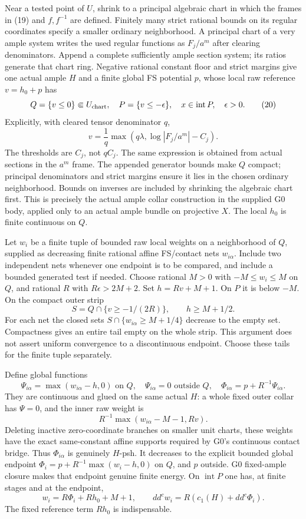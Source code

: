 \documentclass[
  10pt,
]{article}
\begin{document}
Near a tested point of \(U\), shrink to a principal algebraic chart in
which the frames in (19) and \(f,f^{-1}\) are defined. Finitely many
strict rational bounds on its regular coordinates specify a smaller
ordinary neighborhood. A principal chart of a very ample system writes
the used regular functions as \(F_j/a^m\) after clearing denominators.
Append a complete sufficiently ample section system; its ratios generate
that chart ring. Negative rational constant floor and strict margins
give one actual ample \(H\) and a finite global FS potential \(p\),
whose local raw reference \(v=h_0+p\) has
\[Q=\{v\leq0\}\Subset U_{\rm chart},\quad
P=\{v\leq-\epsilon\},\quad x\in\operatorname{int}P,\quad\epsilon>0.\tag{20}\]
Explicitly, with cleared tensor denominator \(q\),
\[v=\frac1q\max(q\lambda,\log|F_j/a^m|-C_j).\tag{21}\] The thresholds
are \(C_j\), not \(qC_j\). The same expression is obtained from actual
sections in the \(a^m\) frame. The appended generator bounds make \(Q\)
compact; principal denominators and strict margins ensure it lies in the
chosen ordinary neighborhood. Bounds on inverses are included by
shrinking the algebraic chart first. This is precisely the actual ample
collar construction in the supplied G0 body, applied only to an actual
ample bundle on projective \(X\). The local \(h_0\) is finite continuous
on \(Q\).

Let \(w_i\) be a finite tuple of bounded raw local weights on a
neighborhood of \(Q\), supplied as decreasing finite rational affine
FS/contact nets \(w_{i\alpha}\). Include two independent nets whenever
one endpoint is to be compared, and include a bounded generated test if
needed. Choose rational \(M>0\) with \(-M\leq w_i\leq M\) on \(Q\), and
rational \(R\) with \(R\epsilon>2M+2\). Set \(h=Rv+M+1\). On \(P\) it is
below \(-M\). On the compact outer strip
\[S=Q\cap\{v\geq-1/(2R)\},\qquad h\geq M+1/2.\tag{22}\] For each net the
closed sets \(S\cap\{w_{i\alpha}\geq M+1/4\}\) decrease to the empty
set. Compactness gives an entire tail empty on the whole strip. This
argument does not assert uniform convergence to a discontinuous
endpoint. Choose these tails for the finite tuple separately.

Define global functions
\[\Psi_{i\alpha}=\max(w_{i\alpha}-h,0)\text{ on }Q,
\quad\Psi_{i\alpha}=0\text{ outside }Q,
\quad\Phi_{i\alpha}=p+R^{-1}\Psi_{i\alpha}.\tag{23}\] They are
continuous and glued on the same actual \(H\): a whole fixed outer
collar has \(\Psi=0\), and the inner raw weight is
\[R^{-1}\max(w_{i\alpha}-M-1,Rv).\tag{24}\] Deleting inactive
zero-coordinate branches on smaller unit charts, these weights have the
exact same-constant affine supports required by G0's continuous contact
bridge. Thus \(\Phi_{i\alpha}\) is genuinely \(H\)-psh. It decreases to
the explicit bounded global endpoint \(\Phi_i=p+R^{-1}\max(w_i-h,0)\) on
\(Q\), and \(p\) outside. G0 fixed-ample closure makes that endpoint
genuine finite energy. On \(\operatorname{int}P\) one has, at finite
stages and at the endpoint, \[w_i=R\Phi_i+Rh_0+M+1,\qquad
dd^cw_i=R(c_1(H)+dd^c\Phi_i).\tag{25}\] The fixed reference term
\(Rh_0\) is indispensable.
\end{document}
